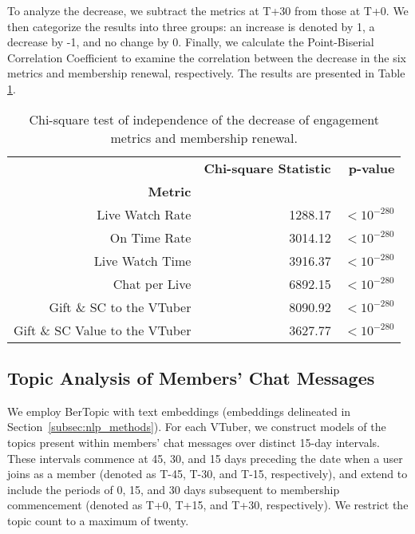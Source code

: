 To analyze the decrease, we subtract the metrics at T+30 from those at T+0. We then categorize the results into three groups: an increase is denoted by 1, a decrease by -1, and no change by 0. Finally, we calculate the Point-Biserial Correlation Coefficient to examine the correlation between the decrease in the six metrics and membership renewal, respectively. The results are presented in Table \ref{table:metrics_correlation}.

\begin{table}[h]
\centering
\small
\begin{tabular}{rrr}
\hline\hline
{}                 & \textbf{Chi-square Statistic}               & \textbf{p-value}                  \\ 
\textbf{Metric}             & {}                      & {}                       \\  
\hline
Live Watch Rate & 1288.17 & $< 10^{-280}$ \\
On Time Rate & 3014.12 & $< 10^{-280}$ \\
Live Watch Time & 3916.37 & $< 10^{-280}$ \\
Chat per Live & 6892.15 & $< 10^{-280}$ \\
Gift \& SC to the VTuber & 8090.92 & $< 10^{-280}$ \\
Gift \& SC Value to the VTuber & 3627.77 & $< 10^{-280}$ \\
\hline\hline
\end{tabular}
\caption{Chi-square test of independence of the decrease of engagement metrics and membership renewal.}
\label{table:metrics_correlation}
\end{table}


\subsection{Topic Analysis of Members' Chat Messages}
\label{subsec:appendix_similarity_topic_analysis}

We employ BerTopic with text embeddings (embeddings delineated in Section~\ref{subsec:nlp_methods}). For each VTuber, we construct models of the topics present within members' chat messages over distinct 15-day intervals. These intervals commence at 45, 30, and 15 days preceding the date when a user joins as a member (denoted as T-45, T-30, and T-15, respectively), and extend to include the periods of 0, 15, and 30 days subsequent to membership commencement (denoted as T+0, T+15, and T+30, respectively). We restrict the topic count to a maximum of twenty.

